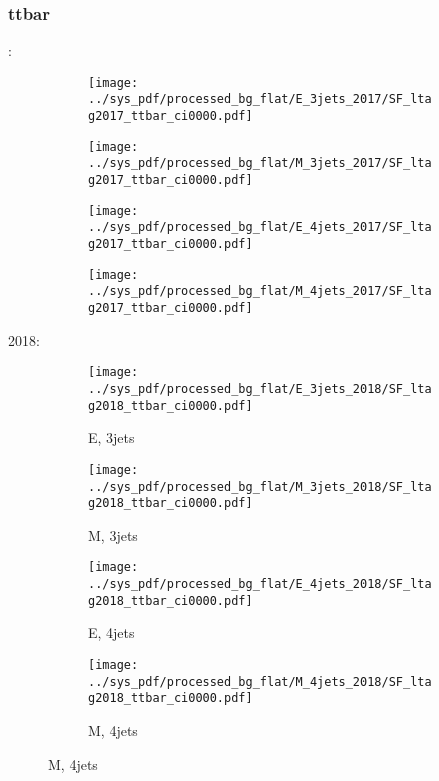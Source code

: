 \documentclass{beamer}
\begin{document}
\begin{frame}
\frametitle{ttbar}
\fontsize{5}{1}:
\begin{figure}
\centering
\begin{subfigure}[b]{0.24\textwidth}
\texttt{[image: ../sys\_pdf/processed\_bg\_flat/E\_3jets\_2017/SF\_ltag2017\_ttbar\_ci0000.pdf]}
\end{subfigure}
\begin{subfigure}[b]{0.24\textwidth}
\texttt{[image: ../sys\_pdf/processed\_bg\_flat/M\_3jets\_2017/SF\_ltag2017\_ttbar\_ci0000.pdf]}
\end{subfigure}
\begin{subfigure}[b]{0.24\textwidth}
\texttt{[image: ../sys\_pdf/processed\_bg\_flat/E\_4jets\_2017/SF\_ltag2017\_ttbar\_ci0000.pdf]}
\end{subfigure}
\begin{subfigure}[b]{0.24\textwidth}
\texttt{[image: ../sys\_pdf/processed\_bg\_flat/M\_4jets\_2017/SF\_ltag2017\_ttbar\_ci0000.pdf]}
\end{subfigure}
\end{figure}
2018:
\begin{figure}
\centering
\begin{subfigure}[b]{0.24\textwidth}
\texttt{[image: ../sys\_pdf/processed\_bg\_flat/E\_3jets\_2018/SF\_ltag2018\_ttbar\_ci0000.pdf]}
\captionsetup{font=tiny}
\caption{E, 3jets}
\end{subfigure}
\begin{subfigure}[b]{0.24\textwidth}
\texttt{[image: ../sys\_pdf/processed\_bg\_flat/M\_3jets\_2018/SF\_ltag2018\_ttbar\_ci0000.pdf]}
\captionsetup{font=tiny}
\caption{M, 3jets}
\end{subfigure}
\begin{subfigure}[b]{0.24\textwidth}
\texttt{[image: ../sys\_pdf/processed\_bg\_flat/E\_4jets\_2018/SF\_ltag2018\_ttbar\_ci0000.pdf]}
\captionsetup{font=tiny}
\caption{E, 4jets}
\end{subfigure}
\begin{subfigure}[b]{0.24\textwidth}
\texttt{[image: ../sys\_pdf/processed\_bg\_flat/M\_4jets\_2018/SF\_ltag2018\_ttbar\_ci0000.pdf]}
\captionsetup{font=tiny}
\caption{M, 4jets}
\end{subfigure}
\end{figure}
\end{frame}
\end{document}
